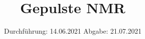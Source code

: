 



\subject{V49}  %
\title{Gepulste NMR} %
\date{%
  Durchführung: 14.06.2021
  \hspace{3em}
  Abgabe: 21.07.2021
}



\maketitle
\thispagestyle{empty}
\tableofcontents
\newpage







\printbibliography{}


